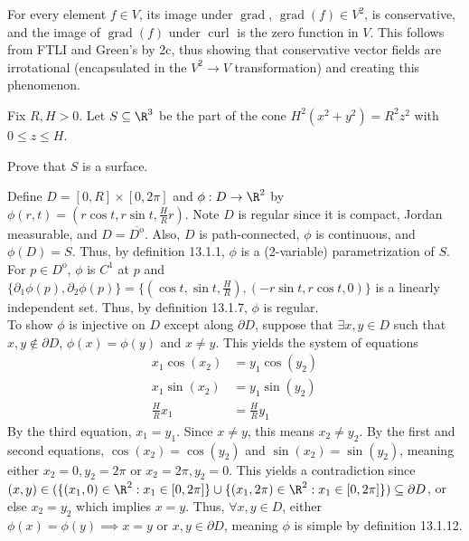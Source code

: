 \documentclass{exam}
\DeclareMathOperator{\Grad}{grad} %
\DeclareMathOperator{\Curl}{curl} %
\begin{document}
\begin{questions}
\begin{parts}
	\begin{answer}{200pt}
For every element $f\in V$, its image under $\Grad$, $\Grad(f)\in V^2$, is conservative, and the image of $\Grad(f)$ under $\Curl$ is the zero function in $V$. This follows from FTLI and Green's by 2c, thus showing that conservative vector fields are irrotational (encapsulated in the $V^2\to V$ transformation) and creating this phenomenon.
	\end{answer}	
\end{parts}


\pagebreak
\question  Fix $R, H > 0$. Let $S\subseteq \R^3$ be the part of the cone $H^2(x^2+y^2) = R^2 z^2$ with $0 \leq z \leq H$. 
\begin{parts}
	\item Prove that $S$ is a surface. 
	\begin{answer}{580pt}
Define $D = [0,R]\times[0,2\pi]$ and $\phi: D \to \R^2$ by $\phi(r,t)=(r\cos t, r\sin t, \frac{H}{R}r)$. Note $D$ is regular since it is compact, Jordan measurable, and $D = \overline{D^{\mathrm{o}}}$. Also, $D$ is path-connected, $\phi$ is continuous, and $\phi(D) = S$. Thus, by definition 13.1.1, $\phi$ is a (2-variable) parametrization of $S$.\\

For $p\in D^{\mathrm{o}}$, $\phi$ is $C^1$ at $p$ and $\{\partial_1\phi(p),\partial_2\phi(p)\}=\{(\cos t, \sin t, \frac{H}{R}), (-r\sin t, r\cos t, 0)\}$ is a linearly independent set. Thus, by definition 13.1.7, $\phi$ is regular.\\

To show $\phi$ is injective on $D$ except along $\partial D$, suppose that $\exists x,y\in D$ such that $x,y\notin\partial D$, $\phi(x)=\phi(y)$ and $x\neq y$. This yields the system of equations\begin{align*}
    x_1\cos(x_2) &= y_1\cos(y_2)\\
    x_1\sin(x_2) &= y_1\sin(y_2)\\
    \frac{H}{R}x_1 &= \frac{H}{R}y_1
\end{align*}By the third equation, $x_1=y_1$. Since $x\neq y$, this means $x_2\neq y_2$. By the first and second equations, $\cos(x_2)=\cos(y_2)$ and $\sin(x_2)=\sin(y_2)$, meaning either $x_2=0,y_2=2\pi$ or $x_2=2\pi,y_2=0$. This yields a contradiction since $(x,y)\in(\{(x_1,0)\in\R^2:x_1\in[0,2\pi]\}\cup\{(x_1,2\pi)\in\R^2:x_1\in[0,2\pi]\})\subseteq\partial D$, or else $x_2=y_2$ which implies $x=y$. Thus, $\forall x,y\in D$, either $\phi(x)=\phi(y)\implies x=y$ or $x,y\in\partial D$, meaning $\phi$ is simple by definition 13.1.12.\\


\end{answer}
\end{parts}
\end{questions}
\end{document}
